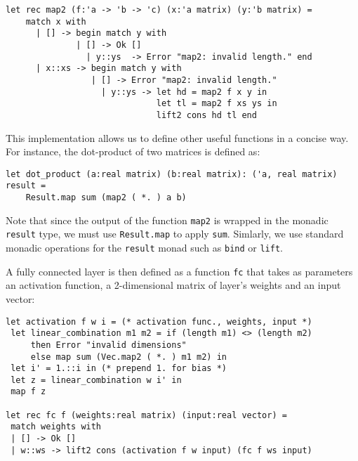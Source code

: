 \documentclass[runningheads]{llncs}
\begin{document}
\begin{lstlisting}[frame=none, language=caml]
  let rec map2 (f:'a -> 'b -> 'c) (x:'a matrix) (y:'b matrix) =
    match x with
	  | [] -> begin match y with
   		      | [] -> Ok []
		        | y::ys  -> Error "map2: invalid length." end
 	  | x::xs -> begin match y with 
  		         | [] -> Error "map2: invalid length." 
		           | y::ys -> let hd = map2 f x y in
		                      let tl = map2 f xs ys in
		                      lift2 cons hd tl end
\end{lstlisting}

This implementation allows us to define other useful functions in a concise way. For instance, the dot-product of two matrices %
is defined as:

\begin{lstlisting}[frame=none, language=caml]
let dot_product (a:real matrix) (b:real matrix): ('a, real matrix) result =
	Result.map sum (map2 ( *. ) a b)
\end{lstlisting}

Note that since the output of the function \lstinline{map2} is wrapped in the monadic \lstinline{result} type, we must use \lstinline{Result.map} to apply \lstinline|sum|. Simlarly, we use standard monadic operations for the \lstinline|result| monad such as \lstinline|bind| or \lstinline|lift|.




A fully connected layer is then defined as a function \lstinline{fc} that takes
as parameters an activation function, a 2-dimensional matrix of
layer's weights and an input vector:
\begin{lstlisting}[caption=Fully connected layer implementation, language=caml, label={lst:fully_connected}]
let activation f w i = (* activation func., weights, input *)
 let linear_combination m1 m2 = if (length m1) <> (length m2)
     then Error "invalid dimensions" 
     else map sum (Vec.map2 ( *. ) m1 m2) in
 let i' = 1.::i in (* prepend 1. for bias *)
 let z = linear_combination w i' in
 map f z
	
let rec fc f (weights:real matrix) (input:real vector) =
 match weights with
 | [] -> Ok []
 | w::ws -> lift2 cons (activation f w input) (fc f ws input)
\end{lstlisting}
\end{document}
